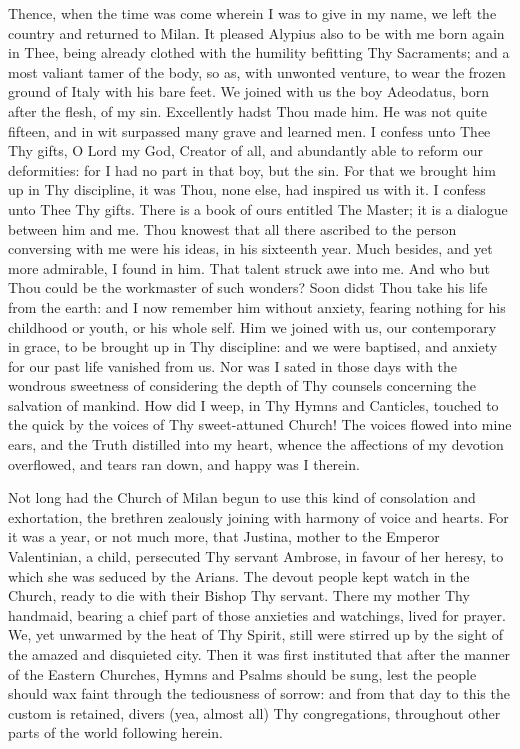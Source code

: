 \documentclass[b5paper,openright,12pt,twoside]{book}
\begin{document}
Thence, when the time was come wherein I was to give in my name, we left
the country and returned to Milan. It pleased Alypius also to be with
me born again in Thee, being already clothed with the humility befitting
Thy Sacraments; and a most valiant tamer of the body, so as, with
unwonted venture, to wear the frozen ground of Italy with his bare feet.
We joined with us the boy Adeodatus, born after the flesh, of my sin.
Excellently hadst Thou made him. He was not quite fifteen, and in wit
surpassed many grave and learned men. I confess unto Thee Thy gifts,
O Lord my God, Creator of all, and abundantly able to reform our
deformities: for I had no part in that boy, but the sin. For that we
brought him up in Thy discipline, it was Thou, none else, had inspired
us with it. I confess unto Thee Thy gifts. There is a book of ours
entitled The Master; it is a dialogue between him and me. Thou knowest
that all there ascribed to the person conversing with me were his ideas,
in his sixteenth year. Much besides, and yet more admirable, I found
in him. That talent struck awe into me. And who but Thou could be the
workmaster of such wonders? Soon didst Thou take his life from the
earth: and I now remember him without anxiety, fearing nothing for
his childhood or youth, or his whole self. Him we joined with us, our
contemporary in grace, to be brought up in Thy discipline: and we were
baptised, and anxiety for our past life vanished from us. Nor was I
sated in those days with the wondrous sweetness of considering the depth
of Thy counsels concerning the salvation of mankind. How did I weep,
in Thy Hymns and Canticles, touched to the quick by the voices of Thy
sweet-attuned Church! The voices flowed into mine ears, and the
Truth distilled into my heart, whence the affections of my devotion
overflowed, and tears ran down, and happy was I therein.

Not long had the Church of Milan begun to use this kind of consolation
and exhortation, the brethren zealously joining with harmony of voice
and hearts. For it was a year, or not much more, that Justina, mother
to the Emperor Valentinian, a child, persecuted Thy servant Ambrose, in
favour of her heresy, to which she was seduced by the Arians. The devout
people kept watch in the Church, ready to die with their Bishop Thy
servant. There my mother Thy handmaid, bearing a chief part of those
anxieties and watchings, lived for prayer. We, yet unwarmed by the heat
of Thy Spirit, still were stirred up by the sight of the amazed and
disquieted city. Then it was first instituted that after the manner of
the Eastern Churches, Hymns and Psalms should be sung, lest the people
should wax faint through the tediousness of sorrow: and from that day to
this the custom is retained, divers (yea, almost all) Thy congregations,
throughout other parts of the world following herein.
\end{document}
